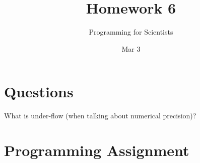 
\author{Programming for Scientists}
\title{Homework 6}
\date{Mar 3}

\maketitle

\chapter{Questions}

\question %
What is under-flow (when talking about numerical precision)?

\question %

\question %

\question %

\question %

\chapter{Programming Assignment}


